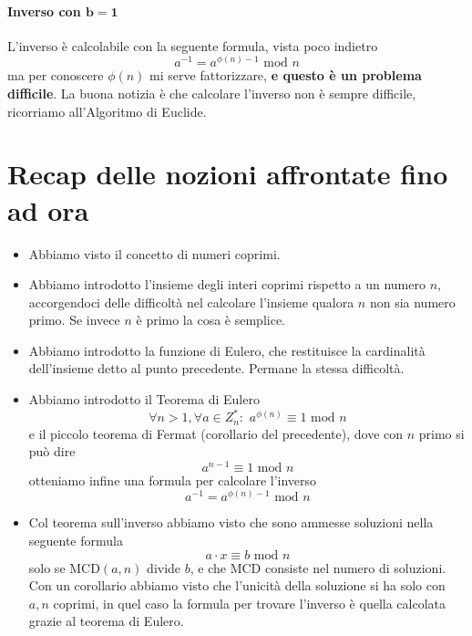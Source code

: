 \paragraph{Inverso con $\mathbf{b=1}$} L'inverso è calcolabile con la seguente formula, vista poco indietro
$$ \boxed{a^{-1} = a^{\phi(n)-1} \text{ mod } n} $$
ma per conoscere $\phi(n)$ mi serve fattorizzare, \textbf{e questo è un problema difficile}. La buona notizia è che calcolare l'inverso non è sempre difficile, ricorriamo all'Algoritmo di Euclide.
\section{Recap delle nozioni affrontate fino ad ora}
\begin{itemize}
	\item Abbiamo visto il concetto di numeri coprimi.
	\item Abbiamo introdotto l'insieme degli interi coprimi rispetto a un numero $n$, accorgendoci delle difficoltà nel calcolare l'insieme qualora $n$ non sia numero primo. Se invece $n$ è primo la cosa è semplice.
	\item Abbiamo introdotto la funzione di Eulero, che restituisce la cardinalità dell'insieme detto al punto precedente. Permane la stessa difficoltà.
	\item Abbiamo introdotto il Teorema di Eulero
	$$ {\forall n>1, \forall a \in Z_{n}^*:\,\,a^{\phi(n)}\equiv 1 \text{ mod } n} $$
	e il piccolo teorema di Fermat (corollario del precedente), dove con $n$ primo si può dire
	$$ a^{n-1} \equiv 1 \text{ mod } n $$
	otteniamo infine una formula per calcolare l'inverso
	$$a^{-1}=a^{\phi(n)-1} \text{ mod }n$$
	\item Col teorema sull'inverso abbiamo visto che sono ammesse soluzioni nella seguente formula
	$$a\cdot x \equiv b \text{ mod }n$$
	solo se $\text{MCD}(a,n)$ divide $b$, e che MCD consiste nel numero di soluzioni. Con un corollario abbiamo visto che l'unicità della soluzione si ha solo con $a,n$ coprimi, in quel caso la formula per trovare l'inverso è quella calcolata grazie al teorema di Eulero.
\end{itemize}
